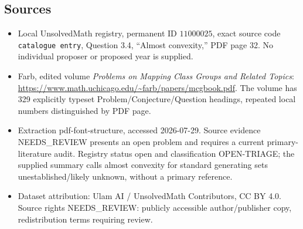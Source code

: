 \documentclass[11pt]{article}
\begin{document}
\subsection{Sources}
\begin{itemize}
\item Local UnsolvedMath registry, permanent ID \(11000025\), exact source code \texttt{catalogue entry}, Question 3.4, ``Almost convexity,'' PDF page 32. No individual proposer or proposed year is supplied.
\item Farb, edited volume \emph{Problems on Mapping Class Groups and Related Topics}: \url{https://www.math.uchicago.edu/~farb/papers/mcgbook.pdf}. The volume has 329 explicitly typeset Problem/Conjecture/Question headings, repeated local numbers distinguished by PDF page.
\item Extraction pdf-font-structure, accessed 2026-07-29. Source evidence NEEDS\_REVIEW presents an open problem and requires a current primary-literature audit. Registry status open and classification OPEN-TRIAGE; the supplied summary calls almost convexity for standard generating sets unestablished/likely unknown, without a primary reference.
\item Dataset attribution: Ulam AI / UnsolvedMath Contributors, CC BY 4.0. Source rights NEEDS\_REVIEW: publicly accessible author/publisher copy, redistribution terms requiring review.
\end{itemize}
\end{document}
